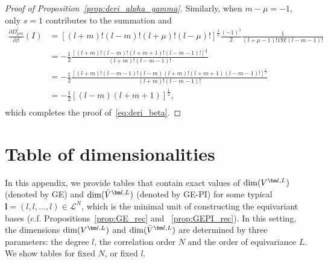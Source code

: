 \documentclass{article}
\newcommand{\bV}{{\bar V}}
\newcommand{\dimge}[2]{\dim(V^{#1,#2})}
\newcommand{\dimpi}[2]{\dim(\bV^{#1,#2})}
\numberwithin{equation}{section}
\def\bl{{\bm l}}
\def\calL{\mathcal{L}}
\def\dim{{{\rm dim}}}
\begin{document}
\begin{proof}[Proof of Proposition~\ref{prop:deri_alpha_gamma}]
Similarly, when $m-\mu=-1$, only $s=1$ contributes to the summation and 
\begin{align*}
    \frac{\partial D^l_{\mu m}}{\partial \beta}(I)
    & = [(l+m)!(l-m)!(l+\mu)!(l-\mu)!]^{\frac{1}{2}}\frac{(-1)^{1}}{2}\frac{1}{(l+\mu-1)!1! 0!(l-m-1)!} \\
    & = - \frac{1}{2}\frac{[(l+m)!(l-m)!(l+m+1)!(l-m-1)!]^{\frac{1}{2}}}{(l+m)!(l-m-1)!} \\
    & = - \frac{1}{2}\frac{[(l+m)!(l-m-1)!(l-m)(l+m)!(l+m+1)(l-m-1)!]^{\frac{1}{2}}}{(l+m)!(l-m-1)!} \\
    & = - \frac{1}{2}[(l-m)(l+m+1)]^{\frac{1}{2}}, \\
\end{align*}
which completes the proof of~\eqref{eq:deri_beta}.
\end{proof} 

\section{Table of dimensionalities}\label{app:table_of_dim}
In this appendix, we provide tables that contain exact values of $\dimge{\bl}{L}$ (denoted by GE) and $\dimpi{\bl}{L}$ (denoted by GE-PI) for some typical $\bl=(l,l,\ldots,l)\in\calL^N$, which is the minimal unit of constructing the equivariant bases (c.f. Propositions~\ref{prop:GE_rec} and ~\ref{prop:GEPI_rec}). 
In this setting, the dimensions $\dimge{\bl}{L}$ and $\dimpi{\bl}{L}$ are determined by three parameters: the degree $l$, the correlation order $N$ and the order of equivariance $L$. We show tables for fixed $N$, or fixed $l$.
\end{document}
